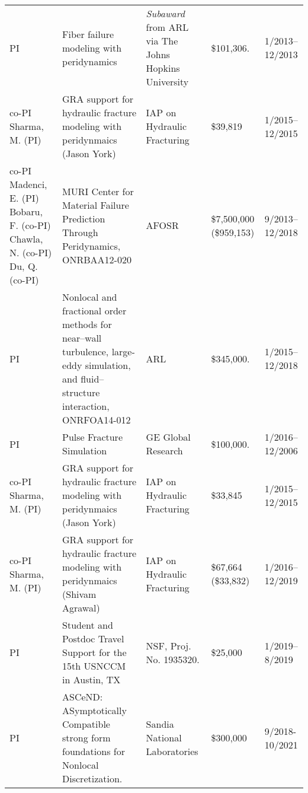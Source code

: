 {\begin{center}
\begin{longtable}{p{1.7cm}p{6.5cm}p{3cm}P{1.5cm}p{1.0cm}}
      PI & Fiber failure modeling with peridynamics & \textit{Subaward} from ARL via The Johns Hopkins University & \$101,306. & 1/2013--12/2013 \\
      co-PI \newline Sharma, \newline M. (PI) & GRA support for hydraulic fracture modeling with peridynmaics (Jason York) & IAP on Hydraulic Fracturing & \$39,819 & 1/2015--12/2015 \\
      co-PI \newline Madenci, \newline E. (PI) \newline Bobaru, \newline F. (co-PI) \newline Chawla, \newline N. (co-PI) \newline Du, \newline Q. (co-PI) & MURI Center for Material Failure Prediction Through Peridynamics, ONRBAA12-020  & AFOSR & \$7,500,000 \newline  (\$959,153) & 9/2013--12/2018 \\
      PI & Nonlocal and fractional order methods for near--wall turbulence, large-eddy simulation, and fluid--structure interaction, ONRFOA14-012 & ARL & {\$}345,000. &  1/2015--12/2018 \\
      PI & Pulse Fracture Simulation & GE Global Research & \$100,000. & 1/2016--12/2006 \\
      co-PI \newline Sharma, \newline M. (PI) & GRA support for hydraulic fracture modeling with peridynmaics (Jason York) & IAP on Hydraulic Fracturing & \$33,845 & 1/2015--12/2015 \\
      co-PI \newline Sharma, \newline M. (PI) & GRA support for hydraulic fracture modeling with peridynmaics (Shivam Agrawal) & IAP on Hydraulic Fracturing  & \$67,664 \newline (\$33,832) & 1/2016--12/2019 \\
      PI & Student and Postdoc Travel Support for the 15th USNCCM in Austin, TX &  NSF, Proj. No. 1935320. & \$25,000 & 1/2019--8/2019 \\
      PI &  ASCeND: ASymptotically Compatible strong form foundations for Nonlocal Discretization. &  Sandia National Laboratories & \$300,000 & 9/2018-10/2021 \\

\end{longtable}
\end{center}}
